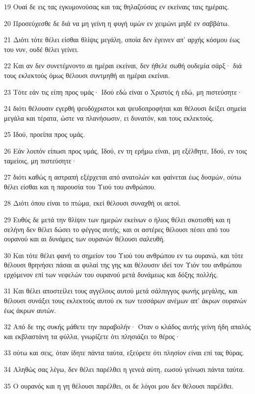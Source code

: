 \par 19 Ουαί δε εις τας εγκυμονούσας και τας θηλαζούσας εν εκείναις ταις ημέραις.
\par 20 Προσεύχεσθε δε διά να μη γείνη η φυγή υμών εν χειμώνι μηδέ εν σαββάτω.
\par 21 Διότι τότε θέλει είσθαι θλίψις μεγάλη, οποία δεν έγεινεν απ' αρχής κόσμου έως του νυν, ουδέ θέλει γείνει.
\par 22 Και αν δεν συνετέμνοντο αι ημέραι εκείναι, δεν ήθελε σωθή ουδεμία σάρξ· διά τους εκλεκτούς όμως θέλουσι συντμηθή αι ημέραι εκείναι.
\par 23 Τότε εάν τις είπη προς υμάς· Ιδού εδώ είναι ο Χριστός ή εδώ, μη πιστεύσητε·
\par 24 διότι θέλουσιν εγερθή ψευδόχριστοι και ψευδοπροφήται και θέλουσι δείξει σημεία μεγάλα και τέρατα, ώστε να πλανήσωσιν, ει δυνατόν, και τους εκλεκτούς.
\par 25 Ιδού, προείπα προς υμάς.
\par 26 Εάν λοιπόν είπωσι προς υμάς, Ιδού, εν τη ερήμω είναι, μη εξέλθητε, Ιδού, εν τοις ταμείοις, μη πιστεύσητε·
\par 27 διότι καθώς η αστραπή εξέρχεται από ανατολών και φαίνεται έως δυσμών, ούτω θέλει είσθαι και η παρουσία του Υιού του ανθρώπου.
\par 28 Διότι όπου είναι το πτώμα, εκεί θέλουσι συναχθή οι αετοί.
\par 29 Ευθύς δε μετά την θλίψιν των ημερών εκείνων ο ήλιος θέλει σκοτισθή και η σελήνη δεν θέλει δώσει το φέγγος αυτής, και οι αστέρες θέλουσι πέσει από του ουρανού και αι δυνάμεις των ουρανών θέλουσι σαλευθή.
\par 30 Και τότε θέλει φανή το σημείον του Υιού του ανθρώπου εν τω ουρανώ, και τότε θέλουσι θρηνήσει πάσαι αι φυλαί της γης και θέλουσιν ιδεί τον Υιόν του ανθρώπου ερχόμενον επί των νεφελών του ουρανού μετά δυνάμεως και δόξης πολλής.
\par 31 Και θέλει αποστείλει τους αγγέλους αυτού μετά σάλπιγγος φωνής μεγάλης, και θέλουσι συνάξει τους εκλεκτούς αυτού εκ των τεσσάρων ανέμων απ' άκρων ουρανών έως άκρων αυτών.
\par 32 Από δε της συκής μάθετε την παραβολήν· Όταν ο κλάδος αυτής γείνη ήδη απαλός και εκβλαστάνη τα φύλλα, γνωρίζετε ότι πλησιάζει το θέρος·
\par 33 ούτω και σεις, όταν ίδητε πάντα ταύτα, εξεύρετε ότι πλησίον είναι επί τας θύρας.
\par 34 Αληθώς σας λέγω, δεν θέλει παρέλθει η γενεά αύτη, εωσού γείνωσι πάντα ταύτα.
\par 35 Ο ουρανός και η γη θέλουσι παρέλθει, οι δε λόγοι μου δεν θέλουσι παρέλθει.
